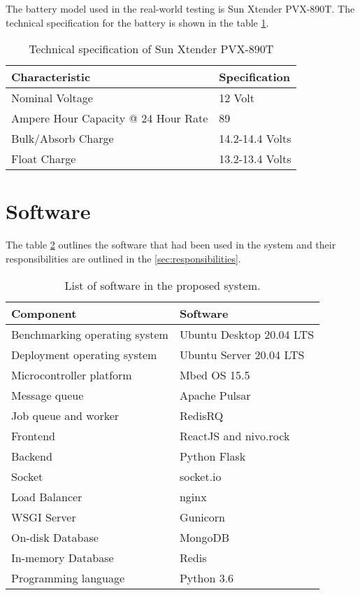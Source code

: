 \documentclass[../thesis.tex]{subfiles}
\begin{document}
The battery model used in the real-world testing is Sun Xtender PVX-890T. The technical specification for the battery is shown in the table \ref{tab:pvx890t}. 

\begin{table}[h!]
	\begin{center}
		\caption{Technical specification of Sun Xtender PVX-890T}
		\label{tab:pvx890t}
		\begin{tabular}{l|l}
			\toprule
			\textbf{Characteristic} & \textbf{Specification}\\
			\midrule
			Nominal Voltage & 12 Volt\\
			Ampere Hour Capacity @ 24 Hour Rate & 89\\
			Bulk/Absorb Charge & 14.2-14.4 Volts\\
			Float Charge & 13.2-13.4 Volts\\
			\bottomrule
		\end{tabular}
	\end{center}
\end{table}

\section{Software}

The table \ref{tab:softwareList} outlines the software that had been used in the system and their responsibilities are outlined in the \autoref{sec:responsibilities}. 

\begin{table}[h!]
	\begin{center}
		\caption{List of software in the proposed system.}
		\label{tab:softwareList}
		\begin{tabular}{l|l}
			\toprule
			\textbf{Component} & \textbf{Software}\\
			\midrule
			Benchmarking operating system & Ubuntu Desktop 20.04 LTS\\
			Deployment operating system & Ubuntu Server 20.04 LTS\\
			Microcontroller platform & Mbed OS 15.5\\
			Message queue & Apache Pulsar\\
			Job queue and worker & RedisRQ\\
			Frontend & ReactJS and nivo.rock\\
			Backend & Python Flask\\
			Socket & socket.io\\
			Load Balancer & nginx\\
			WSGI Server & Gunicorn\\
			On-disk Database & MongoDB\\
			In-memory Database & Redis\\
			Programming language & Python 3.6\\
			\bottomrule
		\end{tabular}
	\end{center}
\end{table}
\end{document}
